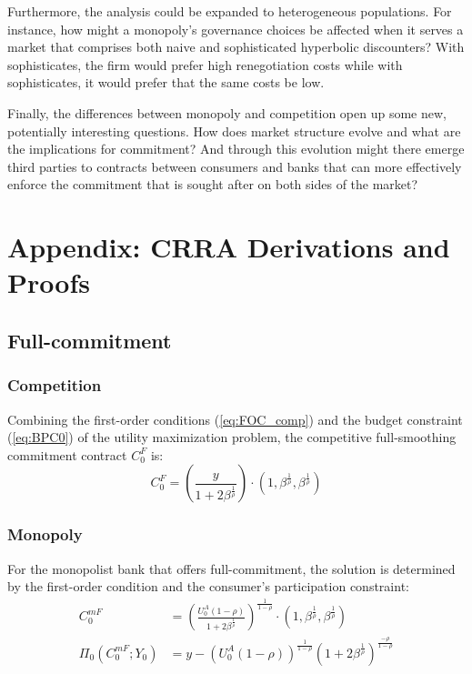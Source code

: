 \documentclass[11pt,english]{article}
\theoremstyle{plain}
\theoremstyle{definition}
\begin{document}
Furthermore, the analysis could be expanded to heterogeneous populations.
For instance, how might a monopoly's governance choices be affected
when it serves a market that comprises both naive and sophisticated
hyperbolic discounters? With sophisticates, the firm would prefer
high renegotiation costs while with sophisticates, it would prefer
that the same costs be low.

Finally, the differences between monopoly and competition open up
some new, potentially interesting questions. How does market structure
evolve and what are the implications for commitment? And through this
evolution might there emerge third parties to contracts between consumers
and banks that can more effectively enforce the commitment that is
sought after on both sides of the market?

\section{Appendix: CRRA Derivations and Proofs}

\subsection{Full-commitment}

\subsubsection{Competition}

Combining the first-order conditions (\ref{eq:FOC_comp}) and the
budget constraint (\ref{eq:BPC0}) of the utility maximization problem,
the competitive full-smoothing commitment contract $C_{0}^{F}$ is:
\begin{equation}
C_{0}^{F}=\left(\frac{y}{1+2\beta^{\frac{1}{\rho}}}\right)\cdot\left(1,\beta^{\frac{1}{\rho}},\beta^{\frac{1}{\rho}}\right)\label{eq:c-f}
\end{equation}

\subsubsection{Monopoly}

For the monopolist bank that offers full-commitment, the solution
is determined by the first-order condition and the consumer's participation
constraint: 
\begin{align}
C_{0}^{mF} & =\left(\frac{U_{0}^{A}\left(1-\rho\right)}{1+2\beta^{\frac{1}{\rho}}}\right)^{\frac{1}{1-\rho}}\cdot\left(1,\beta^{\frac{1}{\rho}},\beta^{\frac{1}{\rho}}\right)\label{eq:c-mf}\\
\Pi_{0}\left(C_{0}^{mF};Y_{0}\right) & =y-\left(U_{0}^{A}\left(1-\rho\right)\right)^{\frac{1}{1-\rho}}\left(1+2\beta^{\frac{1}{\rho}}\right)^{\frac{-\rho}{1-\rho}}\label{eq:pi-mf}
\end{align}
\end{document}

